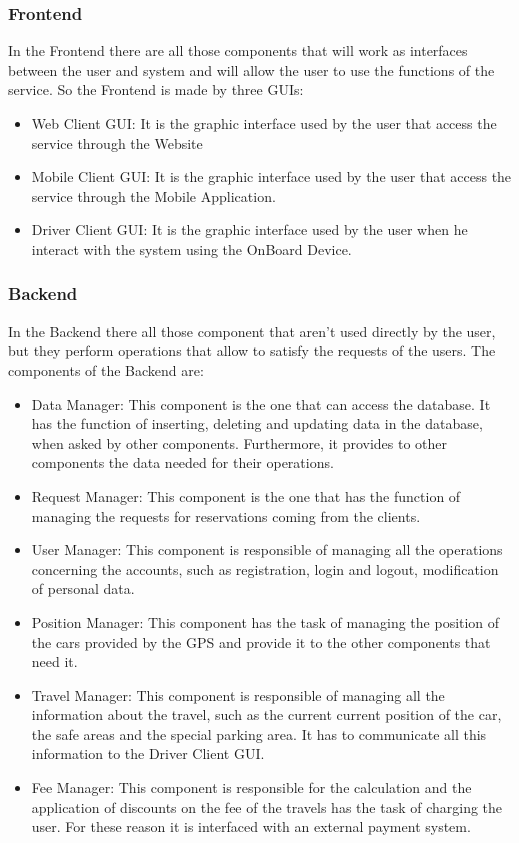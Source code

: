 \subsubsection{Frontend}
In the Frontend there are all those components that will work as interfaces between the user and system and will allow the user to use the functions of the service. So the Frontend is made by three GUIs:
\begin{itemize}
\item Web Client GUI: It is the graphic interface used by the user that access the service through the Website
\item Mobile Client GUI: It is the graphic interface used by the user that access the service through the Mobile Application.
\item Driver Client GUI: It is the graphic interface used by the user when he interact with the system using the OnBoard Device.
\end{itemize}

\subsubsection{Backend}
In the Backend there all those component that aren't used directly by the user, but they perform operations that allow to satisfy the requests of the users. The components of the Backend are:
\begin{itemize}
\item Data Manager: This component is the one that can access the database. It has the function of inserting, deleting and updating data in the database, when asked by other components. Furthermore, it provides to other components the data needed for their operations.
\item Request Manager: This component is the one that has the function of managing the requests for reservations coming from the clients.
\item User Manager: This component is responsible of managing all the operations concerning the accounts, such as registration, login and logout, modification of personal data.
\item Position Manager: This component has the task of managing the position of the cars provided by the GPS and provide it to the other components that need it. 
\item Travel Manager: This component is responsible of managing all the information about the travel, such as the current current position of the car, the safe areas and the special parking area. It has to communicate all this information to the Driver Client GUI.
\item Fee Manager: This component is responsible for the calculation and the application of discounts on the fee of the travels has the task of charging the user. For these reason it is interfaced with an external payment system. 
\end{itemize}

